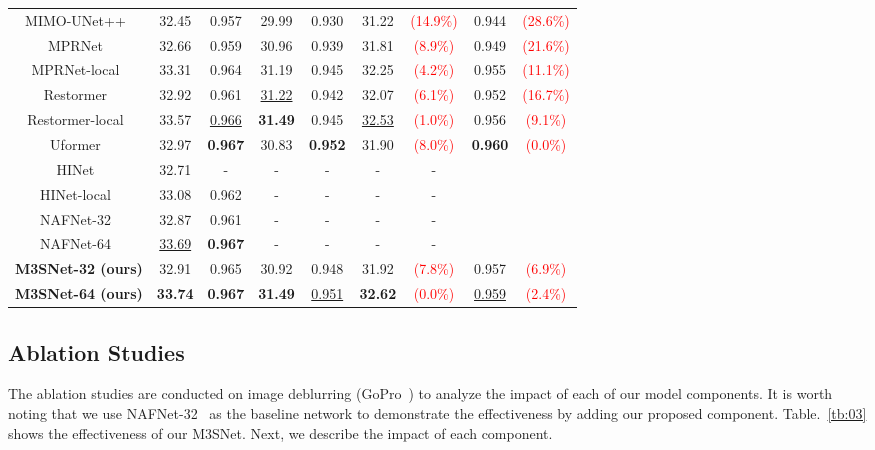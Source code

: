 \documentclass[sn-mathphys,Numbered]{sn-jnl}
\theoremstyle{thmstyleone}\newtheorem{theorem}{Theorem}\newtheorem{proposition}[theorem]{Proposition}
\theoremstyle{thmstyletwo}\newtheorem{example}{Example}\newtheorem{remark}{Remark}
\theoremstyle{thmstylethree}\newtheorem{definition}{Definition}
\begin{document}
\begin{table}[ht]
\begin{tabular}{ccccc||cccc}
    MIMO-UNet++~\cite{2021Rethinking} & 32.45 & 0.957 & 29.99 & 0.930 &31.22  &\textcolor{red}{(14.9\%)}&0.944&\textcolor{red}{(28.6\%)}
    \\
    MPRNet~\cite{Zamir2021MPRNet} & 32.66 & 0.959 & 30.96 & 0.939 &31.81 &\textcolor{red}{(8.9\%)} &0.949&\textcolor{red}{(21.6\%)}
    \\
    MPRNet-local~\cite{Zamir2021MPRNet} & 33.31 & 0.964 &31.19 &0.945 &32.25 &\textcolor{red}{(4.2\%)}&0.955&\textcolor{red}{(11.1\%)}
    \\
    Restormer~\cite{Zamir2021Restormer} & 32.92 & 0.961 & \underline{31.22} & 0.942 &32.07 &\textcolor{red}{(6.1\%)}&0.952&\textcolor{red}{(16.7\%)}
    \\
    Restormer-local~\cite{Zamir2021Restormer} & 33.57 & \underline{0.966} & \textbf{31.49} & 0.945 &\underline{32.53}  &\textcolor{red}{(1.0\%)}&0.956&\textcolor{red}{(9.1\%)}
    \\
    Uformer~\cite{Wang_2022_CVPR} &32.97 & \textbf{0.967} &30.83 &\textbf{0.952} &31.90  &\textcolor{red}{(8.0\%)}&\textbf{0.960}&\textcolor{red}{(0.0\%)}
     \\
    HINet~\cite{Chen_2021_CVPR}&32.71&-&-&-&-&-
    \\
    HINet-local~\cite{Chen_2021_CVPR}&33.08&0.962&-&-&-&-
    \\
    \hline
    NAFNet-32~\cite{chen2022simple}&32.87&0.961&-&-&-&-
    \\
    NAFNet-64~\cite{chen2022simple}&\underline{33.69}&\textbf{0.967}&-&-&-&-
    \\
    \hline
    \textbf{M3SNet-32 (ours)}&32.91&0.965&30.92&0.948&31.92 &\textcolor{red}{(7.8\%)} &0.957&\textcolor{red}{(6.9\%)}
    \\
    \textbf{M3SNet-64 (ours)}&\textbf{33.74}&\textbf{0.967}&\textbf{31.49}&\underline{0.951}&\textbf{32.62} &\textcolor{red}{(0.0\%)} & \underline{0.959}&\textcolor{red}{(2.4\%)}
    \\
    \hline
\end{tabular}

\end{table}



\subsection{Ablation Studies}
The ablation studies are conducted on image deblurring (GoPro~\cite{Gopro}) to analyze the impact of each of our model components. It is worth noting that we use NAFNet-32~\cite{chen2022simple} as the baseline network to demonstrate the effectiveness by adding our proposed component. Table.~\ref{tb:03} shows the effectiveness of our M3SNet. Next, we describe the impact of each component.
\end{document}

